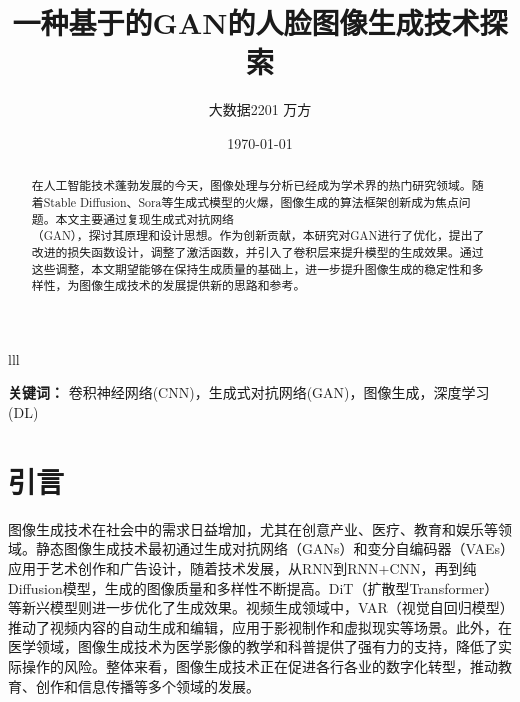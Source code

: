 \documentclass[UTF8]{ctexart}
\title{一种基于的GAN的人脸图像生成技术探索}
\author{大数据2201 万方}
\date{\today}
\providecommand{\keywords}[1]{
\small
\textbf{关键词：} #1
}
\begin{document}
\maketitle
lll
\begin{abstract}
在人工智能技术蓬勃发展的今天，图像处理与分析已经成为学术界的热门研究领域。随着Stable Diffusion、Sora等生成式模型的火爆，图像生成的算法框架创新成为焦点问题。本文主要通过复现生成式对抗网络\\（GAN），探讨其原理和设计思想。作为创新贡献，本研究对GAN进行了优化，提出了改进的损失函数设计，调整了激活函数，并引入了卷积层来提升模型的生成效果。通过这些调整，本文期望能够在保持生成质量的基础上，进一步提升图像生成的稳定性和多样性，为图像生成技术的发展提供新的思路和参考。
\end{abstract}
\keywords{卷积神经网络(CNN)，生成式对抗网络(GAN)，图像生成，深度学习(DL)}
\section{引言}
图像生成技术在社会中的需求日益增加，尤其在创意产业、医疗、教育和娱乐等领域。静态图像生成技术最初通过生成对抗网络（GANs）和变分自编码器（VAEs）应用于艺术创作和广告设计，随着技术发展，从RNN到RNN+CNN，再到纯Diffusion模型，生成的图像质量和多样性不断提高。DiT（扩散型Transformer）等新兴模型则进一步优化了生成效果。视频生成领域中，VAR（视觉自回归模型）推动了视频内容的自动生成和编辑，应用于影视制作和虚拟现实等场景。此外，在医学领域，图像生成技术为医学影像的教学和科普提供了强有力的支持，降低了实际操作的风险。整体来看，图像生成技术正在促进各行各业的数字化转型，推动教育、创作和信息传播等多个领域的发展。\cite{chen_overview_2024}\cite{tian_visual_2024}
\end{document}
